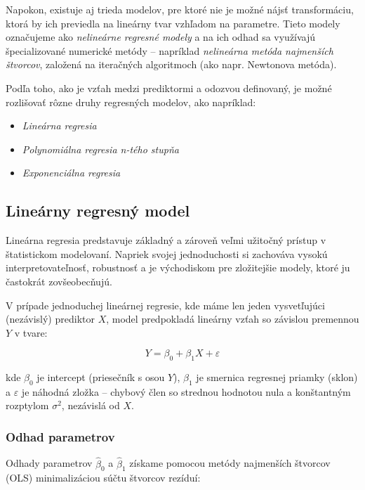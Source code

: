 \smallskip
\noindent
Napokon, existuje aj trieda modelov, pre ktoré nie je možné nájsť transformáciu, ktorá by ich previedla na lineárny tvar vzhľadom na parametre. Tieto modely označujeme ako \textit{nelineárne regresné modely} a na ich odhad sa využívajú špecializované numerické metódy – napríklad \textit{nelineárna metóda najmenších štvorcov}, založená na iteračných algoritmoch (ako napr. Newtonova metóda).

Podľa toho, ako je vzťah medzi prediktormi a odozvou definovaný, je možné rozlišovať rôzne druhy regresných modelov, ako napríklad:
\begin{itemize}
  \item \textit{Lineárna regresia}
  \item \textit{Polynomiálna regresia n-tého stupňa}
  \item \textit{Exponenciálna regresia}
\end{itemize}

\subsection{Lineárny regresný model}
\label{subsec:linear_regression}

Lineárna regresia predstavuje základný a zároveň veľmi užitočný prístup v štatistickom modelovaní. Napriek svojej jednoduchosti si zachováva vysokú interpretovateľnosť, robustnosť a je východiskom pre zložitejšie modely, ktoré ju častokrát zovšeobecňujú.

V prípade jednoduchej lineárnej regresie, kde máme len jeden vysvetľujúci (nezávislý) prediktor $X$, model predpokladá lineárny vzťah so závislou premennou $Y$ v tvare:

\begin{equation}
Y = \beta_0 + \beta_1 X + \varepsilon
\end{equation}

kde $\beta_0$ je intercept (priesečník s osou $Y$), $\beta_1$ je smernica regresnej priamky (sklon) a $\varepsilon$ je náhodná zložka – chybový člen so strednou hodnotou nula a konštantným rozptylom $\sigma^2$, nezávislá od $X$.

\subsubsection{Odhad parametrov}

Odhady parametrov $\hat{\beta}_0$ a $\hat{\beta}_1$ získame pomocou metódy najmenších štvorcov (OLS) minimalizáciou súčtu štvorcov rezíduí:

